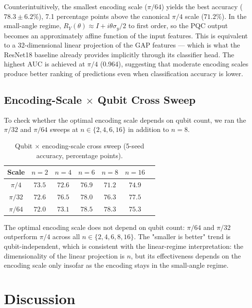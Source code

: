 \documentclass[conference]{IEEEtran}
\begin{document}
Counterintuitively, the smallest encoding scale ($\pi/64$) yields the best accuracy ($78.3 \pm 6.2\%$), 7.1 percentage points above the canonical $\pi/4$ scale ($71.2\%$). In the small-angle regime, $R_Y(\theta) \approx I + i \theta \sigma_y / 2$ to first order, so the PQC output becomes an approximately affine function of the input features. This is equivalent to a 32-dimensional linear projection of the GAP features — which is what the ResNet18 baseline already provides implicitly through its classifier head. The highest AUC is achieved at $\pi/4$ (0.964), suggesting that moderate encoding scales produce better ranking of predictions even when classification accuracy is lower.

\subsection{Encoding-Scale $\times$ Qubit Cross Sweep}
To check whether the optimal encoding scale depends on qubit count, we ran the $\pi/32$ and $\pi/64$ sweeps at $n \in \{2, 4, 6, 16\}$ in addition to $n = 8$.

\begin{table}[h]
\centering
\caption{Qubit $\times$ encoding-scale cross sweep (5-seed accuracy, percentage points).}
\label{tab:cross}
\begin{tabular}{ccccccc}
\toprule
\textbf{Scale} & $n=2$ & $n=4$ & $n=6$ & $n=8$ & $n=16$ \\
\midrule
$\pi/4$  & $73.5$ & $72.6$ & $\mathbf{76.9}$ & $71.2$ & $74.9$ \\
$\pi/32$ & $72.6$ & $76.5$ & $78.0$ & $76.3$ & $\mathbf{77.5}$ \\
$\pi/64$ & $72.0$ & $73.1$ & $\mathbf{78.5}$ & $78.3$ & $75.3$ \\
\bottomrule
\end{tabular}
\end{table}

The optimal encoding scale does not depend on qubit count: $\pi/64$ and $\pi/32$ outperform $\pi/4$ across all $n \in \{2, 4, 6, 8, 16\}$. The "smaller is better" trend is qubit-independent, which is consistent with the linear-regime interpretation: the dimensionality of the linear projection is $n$, but its effectiveness depends on the encoding scale only insofar as the encoding stays in the small-angle regime.

\section{Discussion}
\end{document}

